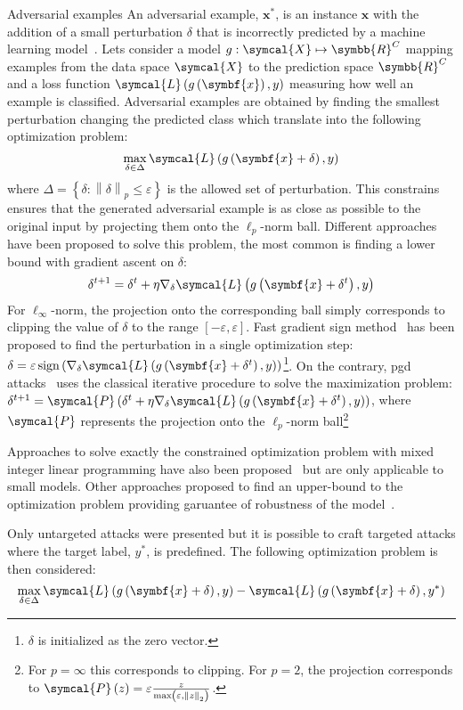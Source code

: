 \documentclass[../main.tex]{subfiles}
\begin{document}
	\begin{mybox}[label={box:adversarial}]{Adversarial examples}
		An adversarial example, \(\symbf{x}^{\ast}\), is an instance \(\symbf{x}\) with the addition of a small perturbation \(\delta\) that is incorrectly predicted by a machine learning model~\cite{Szegedy2013IntriguingPO}. 
		Lets consider a model \(g:\symcal{X} \mapsto \symbb{R}^{C} \) mapping examples from the data space \(\symcal{X}\) to the prediction space \(\symbb{R}^{C}\) and a loss function \(\symcal{L}\left(g\left(\symbf{x}\right), y \right)\) measuring how well an example is classified. 
		Adversarial examples are obtained by finding the smallest perturbation changing the predicted class which translate into the following optimization problem: 
		\[\max_{\delta \in \Delta} \symcal{L}\left(g\left(\symbf{x}+\delta\right), y \right)\]
		where \(\Delta = \left\{\delta: \left\|\delta\right\|_{p} \leq \varepsilon \right\}\) is the allowed set of perturbation.
		This constrains ensures that the generated adversarial example is as close as possible to the original input by projecting them onto the \(\ell_{p}\)-norm ball. 
		Different approaches have been proposed to solve this problem, the most common is finding a lower bound with gradient ascent on \(\delta\): 
		\[\delta^{t+1} = \delta^{t} + \eta \nabla_{\delta}\symcal{L}\left(g\left(\symbf{x}+\delta^{t}\right), y \right)\]
		For \(\ell_{\infty}\)-norm, the projection onto the corresponding ball simply corresponds to clipping the value of \(\delta\) to the range \(\left[-\varepsilon, \varepsilon\right]\).  
		Fast gradient sign method~\cite{FGSM} has been proposed to find the perturbation in a single optimization step: \(\delta = \varepsilon \operatorname{sign}\left(\nabla_{\delta}\symcal{L}\left(g\left(\symbf{x}+\delta^{t}\right), y \right)\right)\)\footnote{\(\delta\) is initialized as the zero vector.}.
		On the contrary, \gls{pgd} attacks~\cite{PGDAttacks,PGDAttacks2} uses the classical iterative procedure to solve the maximization problem: \(\delta^{t+1} = \symcal{P}\left(\delta^{t} + \eta \nabla_{\delta}\symcal{L}\left(g\left(\symbf{x}+\delta^{t}\right), y \right)\right)\), where \(\symcal{P}\) represents the projection onto the \(\ell_{p}\)-norm ball\footnote{For \(p = \infty\) this corresponds to clipping. For \(p =2\), the projection corresponds to \(\symcal{P}\left(z\right) = \varepsilon \frac{z}{\max\left(\varepsilon, \left\|z\right\|_{2}\right)}\).}

		Approaches to solve exactly the constrained optimization problem with mixed integer linear programming have also been proposed~\cite{tjeng2018evaluating} but are only applicable to small models. 
		Other approaches proposed to find an upper-bound to the optimization problem providing garuantee of robustness of the model~\cite{pmlr-v80-wong18a}.

		Only untargeted attacks were presented but it is possible to craft targeted attacks where the target label, \(y^{\ast}\), is predefined. 
		The following optimization problem is then considered: 
		\[\max_{\delta \in \Delta} \symcal{L}\left(g\left(\symbf{x}+\delta\right), y \right) - \symcal{L}\left(g\left(\symbf{x}+\delta\right), y^{\ast} \right)\]
	\end{mybox}
\end{document}
